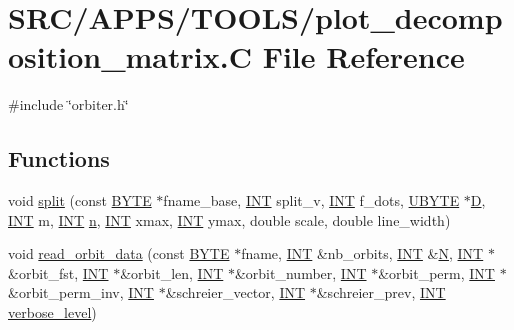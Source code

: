 \hypertarget{plot__decomposition__matrix_8_c}{}\section{S\+R\+C/\+A\+P\+P\+S/\+T\+O\+O\+L\+S/plot\+\_\+decomposition\+\_\+matrix.C File Reference}
\label{plot__decomposition__matrix_8_c}
{\ttfamily \#include \char`\"{}orbiter.\+h\char`\"{}}\newline
\subsection*{Functions}
\begin{DoxyCompactItemize}
\item 
void \mbox{\hyperlink{plot__decomposition__matrix_8_c_a8d46d2e552765fe157db5a0247442503}{split}} (const \mbox{\hyperlink{galois_8h_ab6cc7b4aeb6ea31aba2b3fbfc83ff5e6}{B\+Y\+TE}} $\ast$fname\+\_\+base, \mbox{\hyperlink{galois_8h_a09fddde158a3a20bd2dcadb609de11dc}{I\+NT}} split\+\_\+v, \mbox{\hyperlink{galois_8h_a09fddde158a3a20bd2dcadb609de11dc}{I\+NT}} f\+\_\+dots, \mbox{\hyperlink{galois_8h_a122c4acf389c050379f00341fdcd5812}{U\+B\+Y\+TE}} $\ast$\mbox{\hyperlink{costas_8_c_af13967e8da5ae214c112fd612639beaa}{D}}, \mbox{\hyperlink{galois_8h_a09fddde158a3a20bd2dcadb609de11dc}{I\+NT}} m, \mbox{\hyperlink{galois_8h_a09fddde158a3a20bd2dcadb609de11dc}{I\+NT}} \mbox{\hyperlink{simeon_8_c_a7f2cd26777ce0ff3fdaf8d02aacbddfb}{n}}, \mbox{\hyperlink{galois_8h_a09fddde158a3a20bd2dcadb609de11dc}{I\+NT}} xmax, \mbox{\hyperlink{galois_8h_a09fddde158a3a20bd2dcadb609de11dc}{I\+NT}} ymax, double scale, double line\+\_\+width)
\item 
void \mbox{\hyperlink{plot__decomposition__matrix_8_c_ad8ff5913da1db136439cb6d5bfe6f093}{read\+\_\+orbit\+\_\+data}} (const \mbox{\hyperlink{galois_8h_ab6cc7b4aeb6ea31aba2b3fbfc83ff5e6}{B\+Y\+TE}} $\ast$fname, \mbox{\hyperlink{galois_8h_a09fddde158a3a20bd2dcadb609de11dc}{I\+NT}} \&nb\+\_\+orbits, \mbox{\hyperlink{galois_8h_a09fddde158a3a20bd2dcadb609de11dc}{I\+NT}} \&\mbox{\hyperlink{_a_p_p_s_2_t_d_o_2packing_8_c_a0240ac851181b84ac374872dc5434ee4}{N}}, \mbox{\hyperlink{galois_8h_a09fddde158a3a20bd2dcadb609de11dc}{I\+NT}} $\ast$\&orbit\+\_\+fst, \mbox{\hyperlink{galois_8h_a09fddde158a3a20bd2dcadb609de11dc}{I\+NT}} $\ast$\&orbit\+\_\+len, \mbox{\hyperlink{galois_8h_a09fddde158a3a20bd2dcadb609de11dc}{I\+NT}} $\ast$\&orbit\+\_\+number, \mbox{\hyperlink{galois_8h_a09fddde158a3a20bd2dcadb609de11dc}{I\+NT}} $\ast$\&orbit\+\_\+perm, \mbox{\hyperlink{galois_8h_a09fddde158a3a20bd2dcadb609de11dc}{I\+NT}} $\ast$\&orbit\+\_\+perm\+\_\+inv, \mbox{\hyperlink{galois_8h_a09fddde158a3a20bd2dcadb609de11dc}{I\+NT}} $\ast$\&schreier\+\_\+vector, \mbox{\hyperlink{galois_8h_a09fddde158a3a20bd2dcadb609de11dc}{I\+NT}} $\ast$\&schreier\+\_\+prev, \mbox{\hyperlink{galois_8h_a09fddde158a3a20bd2dcadb609de11dc}{I\+NT}} \mbox{\hyperlink{simeon_8_c_a818073fbcc2f439e7c56952f67386122}{verbose\+\_\+level}})

\end{DoxyCompactItemize}
